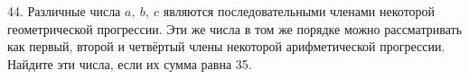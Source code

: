 44. Различные числа $a,\ b,\ c$ являются последовательными членами некоторой геометрической прогрессии. Эти же числа в том же порядке можно рассматривать как первый, второй и четвёртый члены некоторой арифметической прогрессии. Найдите эти числа, если их сумма равна 35.\\
